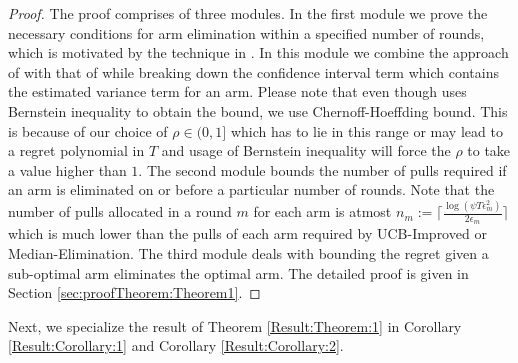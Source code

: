 \begin{proof}
The proof comprises of three modules. In the first module we prove the necessary conditions for arm elimination within a specified number of rounds, which is motivated by the technique in \cite{auer2010ucb}. In this module we combine the approach of \citet{audibert2009exploration} with that of  \citet{auer2010ucb} while breaking down the confidence interval term which contains the estimated variance   term for an arm. Please note that even though \citet{audibert2009exploration} uses Bernstein inequality to obtain the  bound, we use Chernoff-Hoeffding bound. This is because of our choice of $\rho\in (0,1]$ which has to lie in this range or may lead to a regret polynomial in $T$ and usage of Bernstein inequality will force the $\rho$ to take a value higher than $1$. The second module bounds the number of pulls required if an arm is eliminated on or before a particular number of rounds. Note that the number of pulls allocated in a round $m$ for each arm is atmost $n_{m}:=\bigg\lceil\frac{\log{(\psi T\epsilon_{m}^{2})}}{2\epsilon_{m}}\bigg\rceil$ which is much lower than the pulls of each arm required by UCB-Improved or Median-Elimination. The third module deals with bounding the regret given a sub-optimal arm eliminates the optimal arm. The detailed proof is given in Section \ref{sec:proofTheorem:Theorem1}.
\end{proof}
Next, we specialize the result of Theorem \ref{Result:Theorem:1} in Corollary \ref{Result:Corollary:1} and Corollary \ref{Result:Corollary:2}.

